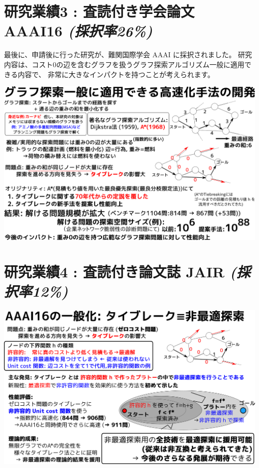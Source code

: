 \section{研究業績3 : 査読付き学会論文 AAAI16 \textbf{\emph{(採択率26\%)}}}
\label{sec-5}

\begin{resume}
最後に、申請後に行った研究が、難関国際学会 AAAI に採択されました。
研究内容は、コスト0の辺を含むグラフを扱うグラフ探索アルゴリズム一般に適用できる内容で、
非常に大きなインパクトを持つことが考えられます。
\end{resume}

\includegraphics{img/aaai16.png}

\section{研究業績4 : 査読付き論文誌 JAIR \textbf{\emph{(採択率12\%)}}}
\label{sec-6}

\begin{resume}
\end{resume}

\includegraphics{img/jair17.png}

